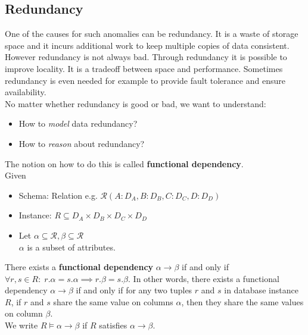 \subsection{Redundancy}
One of the causes for such anomalies can be redundancy. It is a waste of storage space and it incurs additional work to keep multiple copies of data consistent. However redundancy is not always bad. Through redundancy it is possible to improve locality. It is a tradeoff between space and performance. Sometimes redundancy is even needed for example to provide fault tolerance and ensure availability.\\
No matter whether redundancy is good or bad, we want to understand:
\begin{itemize}
\item How to \textit{model} data redundancy?
\item How to \textit{reason} about redundancy?
\end{itemize}
The notion on how to do this is called \textbf{functional dependency}.
\vspace{.4cm}\\
Given\begin{itemize}
\item Schema: Relation e.g. $\mathcal{R}(A:D_A, B:D_B, C:D_C, D:D_D)$
\item Instance: $R\subseteq D_A \times D_B \times D_C \times D_D$
\item Let $\alpha \subseteq \mathcal{R}, \beta \subseteq \mathcal{R}$\\
$\alpha$ is a subset of attributes.
\end{itemize}
There exists a \textbf{functional dependency} $\alpha \to \beta$ if and only if $\forall r, s \in R:\;r.\alpha = s.\alpha \implies r.\beta = s.\beta$. In other words, there exists a functional dependency $\alpha \to \beta$ if and only if for any two tuples $r$ and $s$ in database instance $R$, if $r$ and $s$ share the same value on columns $\alpha$, then they share the same values on column $\beta$. \\
We write $R \models \alpha \to \beta$ if $R$ satisfies $\alpha \to \beta$.

